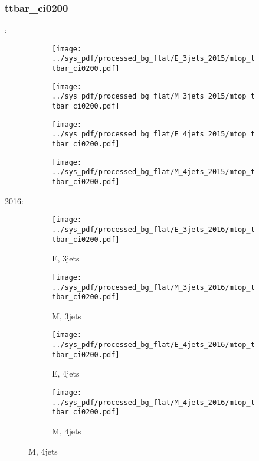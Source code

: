 \documentclass{beamer}
\begin{document}
\begin{frame}
\frametitle{ttbar_ci0200}
\fontsize{5}{1}:
\begin{figure}
\centering
\begin{subfigure}[b]{0.24\textwidth}
\texttt{[image: ../sys\_pdf/processed\_bg\_flat/E\_3jets\_2015/mtop\_ttbar\_ci0200.pdf]}
\end{subfigure}
\begin{subfigure}[b]{0.24\textwidth}
\texttt{[image: ../sys\_pdf/processed\_bg\_flat/M\_3jets\_2015/mtop\_ttbar\_ci0200.pdf]}
\end{subfigure}
\begin{subfigure}[b]{0.24\textwidth}
\texttt{[image: ../sys\_pdf/processed\_bg\_flat/E\_4jets\_2015/mtop\_ttbar\_ci0200.pdf]}
\end{subfigure}
\begin{subfigure}[b]{0.24\textwidth}
\texttt{[image: ../sys\_pdf/processed\_bg\_flat/M\_4jets\_2015/mtop\_ttbar\_ci0200.pdf]}
\end{subfigure}
\end{figure}
2016:
\begin{figure}
\centering
\begin{subfigure}[b]{0.24\textwidth}
\texttt{[image: ../sys\_pdf/processed\_bg\_flat/E\_3jets\_2016/mtop\_ttbar\_ci0200.pdf]}
\captionsetup{font=tiny}
\caption{E, 3jets}
\end{subfigure}
\begin{subfigure}[b]{0.24\textwidth}
\texttt{[image: ../sys\_pdf/processed\_bg\_flat/M\_3jets\_2016/mtop\_ttbar\_ci0200.pdf]}
\captionsetup{font=tiny}
\caption{M, 3jets}
\end{subfigure}
\begin{subfigure}[b]{0.24\textwidth}
\texttt{[image: ../sys\_pdf/processed\_bg\_flat/E\_4jets\_2016/mtop\_ttbar\_ci0200.pdf]}
\captionsetup{font=tiny}
\caption{E, 4jets}
\end{subfigure}
\begin{subfigure}[b]{0.24\textwidth}
\texttt{[image: ../sys\_pdf/processed\_bg\_flat/M\_4jets\_2016/mtop\_ttbar\_ci0200.pdf]}
\captionsetup{font=tiny}
\caption{M, 4jets}
\end{subfigure}
\end{figure}
\end{frame}
\end{document}
